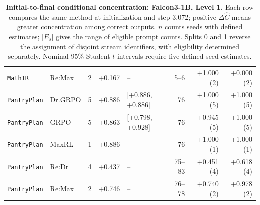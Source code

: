 \begin{table}[!htbp]
\begin{tabular}{@{}llcrlrrr@{}}
\texttt{MathIR} & Re:Max & 2 & +0.167 & -- & 5--6 & +1.000 (2) & +0.000 (2) \\
\texttt{PantryPlan} & Dr.GRPO & 5 & +0.886 & [+0.886, +0.886] & 76 & +1.000 (5) & +1.000 (5) \\
\texttt{PantryPlan} & GRPO & 5 & +0.863 & [+0.798, +0.928] & 76 & +0.945 (5) & +1.000 (5) \\
\texttt{PantryPlan} & MaxRL & 1 & +0.886 & -- & 76 & +1.000 (1) & +1.000 (1) \\
\texttt{PantryPlan} & Re:Dr & 4 & +0.437 & -- & 75--83 & +0.451 (4) & +0.618 (4) \\
\texttt{PantryPlan} & Re:Max & 2 & +0.746 & -- & 76--78 & +0.740 (2) & +0.978 (2) \\
\bottomrule
\end{tabular}
\caption{\textbf{Initial-to-final conditional concentration: Falcon3-1B, Level 1.} Each row compares the same method at initialization and step 3,072; positive $\Delta\widehat C$ means greater concentration among correct outputs. $n$ counts seeds with defined estimates; $|E_s|$ gives the range of eligible prompt counts. Splits 0 and 1 reverse the assignment of disjoint stream identifiers, with eligibility determined separately. Nominal 95\% Student-$t$ intervals require five defined seed estimates.}
\end{table}

